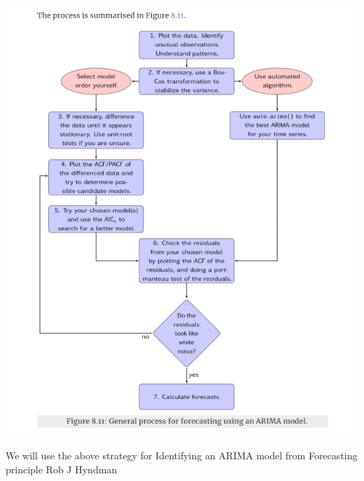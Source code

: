 \documentclass[
  letterpaper,
  DIV=11,
  numbers=noendperiod]{scrartcl}
\begin{document}
\includegraphics{images/clipboard-2535415607.png}

We will use the above strategy for Identifying an ARIMA model from
Forecasting principle Rob J Hyndman
\end{document}
